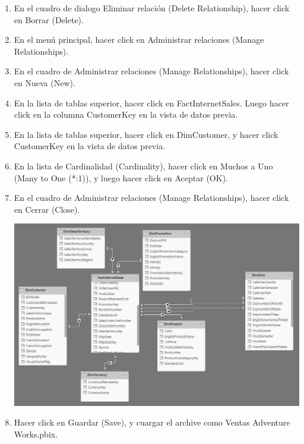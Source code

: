 \begin{enumerate}[1.]
   \item En el cuadro de dialogo Eliminar relación (Delete Relationship), hacer click en Borrar (Delete).

   \item En el menú principal, hacer click en Administrar relaciones (Manage Relationships).

   \item En el cuadro de Administrar relaciones (Manage Relationships), hacer click en Nueva (New).

   \item En la lista de tablas superior, hacer click en FactInternetSales. Luego hacer click en la columna
CustomerKey en la vista de datos previa.

   \item En la lista de tablas superior, hacer click en DimCustomer, y hacer click CustomerKey en la vista de datos
previa.

   \item En la lista de Cardinalidad (Cardinality), hacer click en Muchos a Uno (Many to One (*:1)), y luego hacer
click en Aceptar (OK).

   \item En el cuadro de Administrar relaciones (Manage Relationships), hacer click en Cerrar (Close).

	\begin{center}
	\includegraphics[width=13cm]{./Imagenes/power5}
	\end{center}

   \item Hacer click en Guardar (Save), y cuargar el archive como Ventas Adventure Works.pbix.

\end{enumerate}




